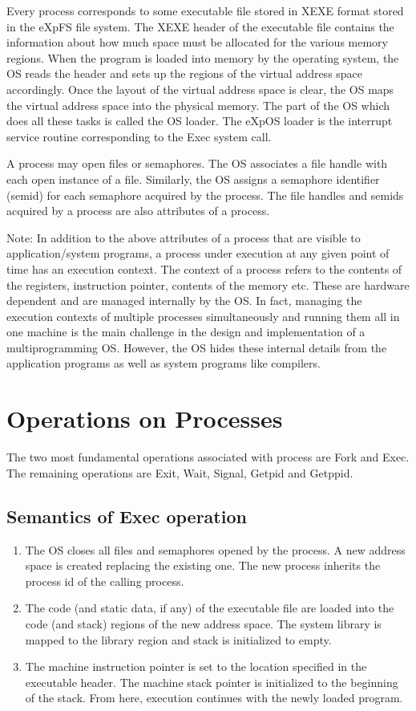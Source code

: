 Every process corresponds to some executable file stored in XEXE format stored in the eXpFS file system. The XEXE header of the executable file contains the information about how much space must be allocated for the various memory regions. When the program is loaded into memory by the operating system, the OS reads the header and sets up the regions of the virtual address space accordingly. Once the layout of the virtual address space is clear, the OS maps the virtual address space into the physical memory. The part of the OS which does all these tasks is called the OS loader. The eXpOS loader is the interrupt service routine corresponding to the Exec system call.

A process may open files or semaphores. The OS associates a file handle with each open instance of a file. Similarly, the OS assigns a semaphore identifier (semid) for each semaphore acquired by the process. The file handles and semids acquired by a process are also attributes of a process.

Note: In addition to the above attributes of a process that are visible to application/system programs, a process under execution at any given point of time has an execution context. The context of a process refers to the contents of the registers, instruction pointer, contents of the memory etc. These are hardware dependent and are managed internally by the OS. In fact, managing the execution contexts of multiple processes simultaneously and running them all in one machine is the main challenge in the design and implementation of a multiprogramming OS. However, the OS hides these internal details from the application programs as well as system programs like compilers. 

\section{Operations on Processes}
The two most fundamental operations associated with process are Fork and Exec. The remaining operations are Exit, Wait, Signal, Getpid and Getppid.

\subsection{Semantics of Exec operation}
\begin{enumerate}
\item The OS closes all files and semaphores opened by the process. A new address space is created replacing the existing one. The new process inherits the process id of the calling process.
\item The code (and static data, if any) of the executable file are loaded into the code (and stack) regions of the new address space. The system library is mapped to the library region and stack is initialized to empty.
\item The machine instruction pointer is set to the location specified in the executable header. The machine stack pointer is initialized to the beginning of the stack. From here, execution continues with the newly loaded program.
\end{enumerate}

